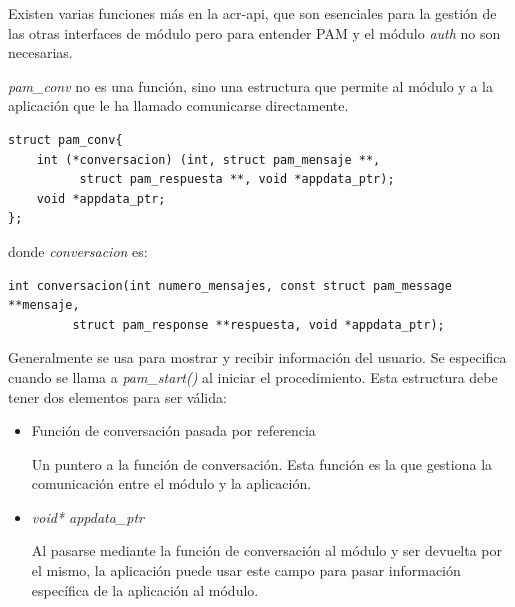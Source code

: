 \documentclass[titlepage, 12pt, a4paper]{article}
\begin{document}
Existen varias funciones más en la \gls{acr-api}, que son esenciales para la gestión de las otras interfaces de módulo pero para entender PAM y el módulo \textit{auth} no son necesarias.\par
\textit{pam\_conv} no es una función, sino una estructura que permite al módulo y a la aplicación que le ha llamado comunicarse directamente.
\begin{lstlisting}
struct pam_conv{
    int (*conversacion) (int, struct pam_mensaje **,
          struct pam_respuesta **, void *appdata_ptr);
    void *appdata_ptr;
};
\end{lstlisting}
donde \textit{conversacion} es:
\begin{lstlisting}
int conversacion(int numero_mensajes, const struct pam_message **mensaje,
		 struct pam_response **respuesta, void *appdata_ptr);
\end{lstlisting}
Generalmente se usa para mostrar y recibir información del usuario. Se especifica cuando se llama a \textit{pam\_start()} al iniciar el procedimiento. Esta estructura debe tener dos elementos para ser válida:
\begin{itemize}
	\item{Función de conversación pasada por referencia}\par Un puntero a la función de conversación. Esta función es la que gestiona la comunicación entre el módulo y la aplicación.
	\item{\textit{void* appdata\_ptr}}\par
		Al pasarse mediante la función de conversación al módulo y ser devuelta por el mismo, la aplicación puede usar este campo para pasar información específica de la aplicación al módulo.
\end{itemize}
\end{document}
